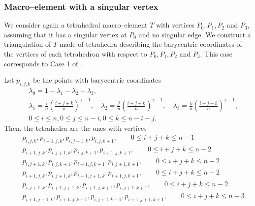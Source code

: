 \subsubsection{Macro--element with a singular vertex}

We consider again a tetrahedral macro--element $T$ with vertices $P_0, P_1, P_2$
and $P_3$, assuming that it has a singular vertex at $P_0$ and no singular edge.
We construct a triangulation of $T$ made of tetrahedra describing 
the barycentric coordinates of the vertices of each tetrahedron with respect
to $P_0, P_1, P_2$ and $P_3$. This case corresponds to Case 1 of \cite{AN}.

Let $p_{i,j,k}$ be the points with barycentric coordinates
\begin{eqnarray*}
&&\lambda_0=1-\lambda_1-\lambda_2-\lambda_3,\\[5pt]
&&\lambda_1=\frac in\left(\frac{i+j+k}n\right)^{\gamma-1},\quad
  \lambda_2=\frac jn\left(\frac{i+j+k}n\right)^{\gamma-1},\quad
  \lambda_3=\frac kn\left(\frac{i+j+k}n\right)^{\gamma-1},
\\[5pt] &&0\le i\le n, 0\le j\le n-i, 0\le k\le n-i-j.
\end{eqnarray*}
Then, the tetrahedra are the ones with vertices
\begin{eqnarray*}
&& p_{i,j,k}, p_{i+1,j,k}, p_{i,j+1,k}, p_{i,j,k+1}, \qquad 0\le i+j+k\le n-1\\
&& p_{i+1,j,k}, p_{i,j+1,k}, p_{i,j,k+1}, p_{i+1,j,k+1}, \qquad 0\le i+j+k\le n-2\\
&& p_{i,j+1,k}, p_{i,j,k+1}, p_{i+1,j,k+1}, p_{i,j+1,k+1}, \qquad 0\le i+j+k\le n-2\\
&& p_{i+1,j,k}, p_{i,j+1,k}, p_{i+1,j+1,k}, p_{i+1,j,k+1}, \qquad 0\le i+j+k\le n-2\\
&& p_{i,j+1,k}, p_{i+1,j+1,k}, p_{i+1,j,k+1}, p_{i,j+1,k+1}, \qquad 0\le i+j+k\le n-2\\
&& p_{i+1,j+1,k}, p_{i+1,j,k+1}, p_{i,j+1,k+1}, p_{i+1,j+1,k+1}, \qquad 0\le i+j+k\le n-3
\end{eqnarray*}


